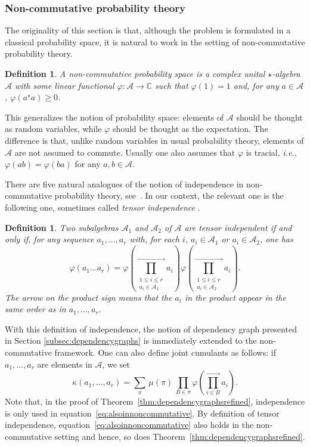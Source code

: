 \documentclass[12pt,a4paper,reqno]{amsart}
\newtheorem{definition}[lemma]{Definition}
\theoremstyle{remark}
\newcommand{\C}{\mathbb{C}}
\begin{document}
\subsubsection{Non-commutative probability theory}
The originality of this section is that, although the problem is formulated in a classical probability space,
it is natural to work in the setting of non-commutative probability theory.
\begin{definition}
    A {\em non-commutative probability space} is a complex unital $\star$-algebra $\mathscr{A}$ 
    with some linear functional $\varphi:\mathscr{A} \to \C$ such that $\varphi(1)=1$ and,
    for any $a \in \mathscr{A}$, $\varphi(a^\star a) \ge 0$.
\end{definition}
This generalizes the notion of probability space: elements of $\mathscr{A}$ should be thought as random variables, while $\varphi$ should be thought as the expectation. The difference is that, unlike random variables in usual probability theory, elements of $\mathscr{A}$ are not assumed to commute. Usually one also assumes that $\varphi$ is tracial, \emph{i.e.}, $\varphi(ab)=\varphi(ba)$ for any $a,b\in\mathscr{A}$.\bigskip

There are five natural analogues of the notion of independence in non-commutative probability theory, see~\cite{Muraki03}. In our context, the relevant one is the following one, sometimes called {\em tensor independence} \cite[Definition 1.1]{HS10}.
\begin{definition}
    Two subalgebras $\mathscr{A}_1$ and $\mathscr{A}_2$ of $\mathscr{A}$ are {\em tensor independent} if and only if, for any sequence $a_1,\dots,a_r$ with, for each $i$, $a_i \in \mathscr{A}_1$ or $a_i \in \mathscr{A}_2$, one has
    \[\varphi(a_1 \dots a_r) = 
    \varphi \left(\prod_{\substack{1\le i \le r \\ a_i \in \mathscr{A}_1}}^{\rightarrow} a_i\right)
    \varphi \left(\prod_{\substack{1\le i \le r \\ a_i \in \mathscr{A}_2}}^{\rightarrow} a_i\right)
    .\]
    The arrow on the product sign means that the $a_i$ in the product appear in the same order as in $a_1,\dots,a_r$.
\end{definition}

With this definition of independence, the notion of dependency graph presented in Section \ref{subsec:dependencygraphs} is immediately extended to the non-commutative framework. One can also define joint cumulants as follows: if $a_1,\dots,a_r$ are elements in $\mathscr{A}$, we set
$$\kappa(a_1,\dots,a_r) = \sum_{\pi} \,\mu(\pi) \,\prod_{B \in \pi} \varphi \!\left( 
\prod^{\rightarrow}_{i \in B} a_i \right).$$
Note that, in the proof of Theorem~\ref{thm:dependencygraphsrefined}, independence is only used in equation~\eqref{eq:alsoinnoncommutative}. By definition of tensor independence, equation~\eqref{eq:alsoinnoncommutative} also holds in the non-commutative setting and hence, so does Theorem~\ref{thm:dependencygraphsrefined}.
\bigskip
\end{document}
